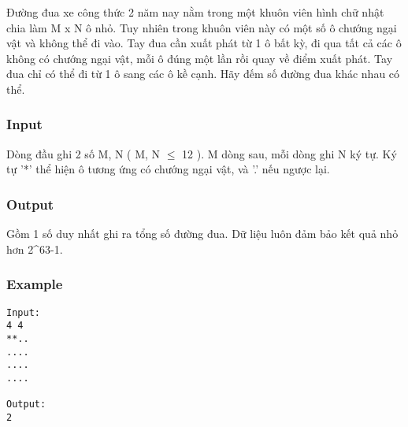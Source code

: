 



   Đường đua xe công thức 2 năm nay nằm trong một khuôn viên hình chữ nhật chia làm M x N ô nhỏ. Tuy nhiên trong khuôn viên này có một số ô chướng ngại vật và không thể đi vào. Tay đua cần xuất phát từ 1 ô bất kỳ, đi qua tất cả các ô không có chướng ngại vật, mỗi ô đúng một lần rồi quay về điểm xuất phát. Tay đua chỉ có thể đi từ 1 ô sang các ô kề cạnh. Hãy đếm số đường đua khác nhau có thể.  

\subsubsection{   Input  }

   Dòng đầu ghi 2 số M, N ( M, N  $\le$  12 ). M dòng sau, mỗi dòng ghi N ký tự. Ký tự '*' thể hiện ô tương ứng có chướng ngại vật, và '.' nếu ngược lại.  

\subsubsection{   Output  }

   Gồm 1 số duy nhất ghi ra tổng số đường đua. Dữ liệu luôn đảm bảo kết quả nhỏ hơn 2^63-1.  

\subsubsection{   Example  }
\begin{verbatim}
Input:
4 4
**..
....
....
....

Output:
2
\end{verbatim}

